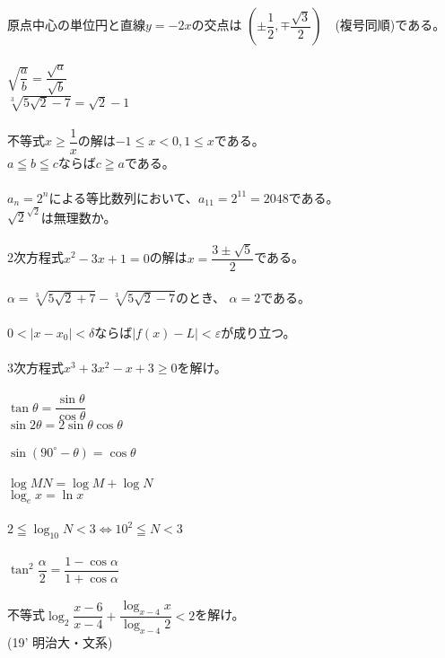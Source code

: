 \documentclass{ltjsarticle}
\begin{document}
\noindent
原点中心の単位円と直線$y=-2x$の交点は
$(\pm\dfrac{1}{2},\mp\dfrac{\sqrt{3}}{2})$　(複号同順)である。
\\ \\
\noindent
$\sqrt{\dfrac{a}{b}}=\dfrac{\sqrt{a}}{\sqrt{b}}$\\
$\sqrt[3]{5\sqrt{2}-7}=\sqrt{2}-1$
\\ \\
\noindent
不等式$x\geq\dfrac{1}{x}$の解は$-1\leq x<0,1\leq x$である。\\
$a\leqq b\leqq c$ならば$c\geqq a$である。
\\ \\
\noindent
$a_n=2^n$による等比数列において、$a_{11}=2^{11}=2048$である。\\
$\sqrt{2}^{\sqrt{2}}$は無理数か。
\\ \\
\noindent
2次方程式$x^2-3x+1=0$の解は$x=\dfrac{3\pm\sqrt{5}}{2}$である。
\\ \\
\noindent
$\alpha =\sqrt[3]{5\sqrt{2}+7}-\sqrt[3]{5\sqrt{2}-7}$のとき、
$\alpha =2$である。
\\ \\
\noindent
$0<|x-x_0|<\delta$ならば$|f(x)-L|<\varepsilon$が成り立つ。
\\ \\
\noindent
3次方程式$x^3+3x^2-x+3\geq 0$を解け。
\\ \\
\noindent
$\tan\theta = \dfrac{\sin\theta}{\cos\theta}$\\
$\sin 2\theta =2\sin\theta\cos\theta$
\\ \\
\noindent
$\sin (90^{\circ}-\theta )=\cos\theta$
\\ \\
\noindent
$\log MN=\log M+\log N$\\
$\log _e x=\ln x$
\\ \\
\noindent
$2\leqq \log _{10}N<3 \Leftrightarrow 10^2\leqq N<3$
\\ \\
\noindent
$\tan ^2\dfrac{\alpha}{2}=\dfrac{1-\cos\alpha}{1+\cos\alpha}$
\\ \\
\noindent
不等式$\log _2\dfrac{x-6}{x-4}+\dfrac{\log _{x-4}x}{\log _{x-4}2}<2$を解け。\\
\hfill (19' 明治大・文系)
\end{document}
